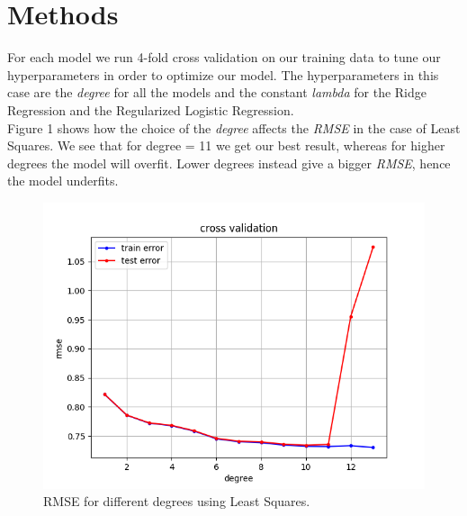 \documentclass[10pt,conference,compsocconf]{IEEEtran}
\begin{document}
\section{Methods}
\label{sec:tips-writing}


For each model we run 4-fold cross validation on our training data to tune our hyperparameters in order to optimize our model. The hyperparameters in this case are the \textit{degree} for all the models and the constant \textit{lambda} for the Ridge Regression and the Regularized Logistic Regression.
\\
Figure 1 shows how the choice of the \textit{degree} affects the \textit{RMSE} in the case of Least Squares. We see that for degree = 11 we get our best result, whereas for higher degrees the model will overfit. Lower degrees instead give a bigger \textit{RMSE}, hence the model underfits.



\begin{figure}[htbp]
  \centering
  \includegraphics[width=\columnwidth]{cross_validation_leastsquares.png}
  \caption{RMSE for different degrees using Least Squares.}
  \vspace{-3mm}
  \label{fig:crossvalidationleastsquares}
\end{figure}
\end{document}
